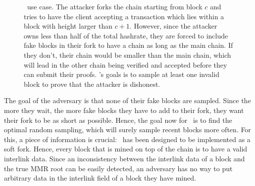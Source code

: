               \begin{figure}[ht]
              \centering
              \caption{\FC\ use case. The attacker forks the chain starting from block \(c\) and tries to have the client accepting a transaction which lies within a block with height larger than \(c+1\). However, since the attacker owns less than half of the total hashrate, they are forced to include fake blocks in their fork to have a chain as long as the main chain. If they don't, their chain would be smaller than the main chain, which will lead in the other chain being verified and accepted before they can submit their proofs. \FC's goals is to sample at least one invalid block to prove that the attacker is dishonest.}
              \label{figure:fcusecase}
            \end{figure}
        
          The goal of the adversary is that none of their fake blocks are sampled. Since the more they wait, the more fake blocks they have to add to their fork, they want their fork to be as short as possible. Hence, the goal now for \FC\ is to find the optimal random sampling, which will surely sample recent blocks more often. For this, a piece of information is crucial: \FC\ has been designed to be implemented as a soft fork. Hence, every block that is mined on top of the chain is to have a valid interlink data. Since an inconsistency between the interlink data of a block and the true MMR root can be easily detected, an adversary has no way to put arbitrary data in the interlink field of a block they have mined.
          

